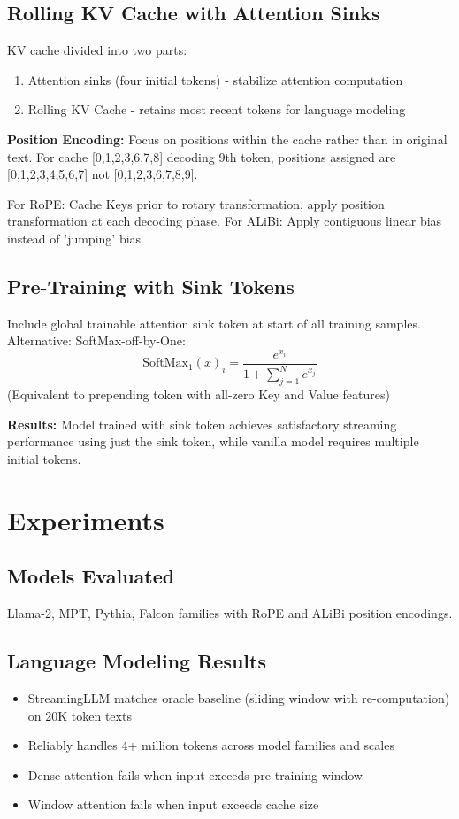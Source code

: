 \subsection{Rolling KV Cache with Attention Sinks}
KV cache divided into two parts:
\begin{enumerate}
\item Attention sinks (four initial tokens) - stabilize attention computation
\item Rolling KV Cache - retains most recent tokens for language modeling
\end{enumerate}

\textbf{Position Encoding:} Focus on positions within the cache rather than in original text. For cache [0,1,2,3,6,7,8] decoding 9th token, positions assigned are [0,1,2,3,4,5,6,7] not [0,1,2,3,6,7,8,9].

For RoPE: Cache Keys prior to rotary transformation, apply position transformation at each decoding phase.
For ALiBi: Apply contiguous linear bias instead of 'jumping' bias.

\subsection{Pre-Training with Sink Tokens}
Include global trainable attention sink token at start of all training samples. Alternative: SoftMax-off-by-One:
\begin{equation}
\text{SoftMax}_1(x)_i = \frac{e^{x_i}}{1 + \sum_{j=1}^N e^{x_j}}
\end{equation}
(Equivalent to prepending token with all-zero Key and Value features)

\textbf{Results:} Model trained with sink token achieves satisfactory streaming performance using just the sink token, while vanilla model requires multiple initial tokens.

\section{Experiments}

\subsection{Models Evaluated}
Llama-2, MPT, Pythia, Falcon families with RoPE and ALiBi position encodings.

\subsection{Language Modeling Results}
\begin{itemize}
\item StreamingLLM matches oracle baseline (sliding window with re-computation) on 20K token texts
\item Reliably handles 4+ million tokens across model families and scales
\item Dense attention fails when input exceeds pre-training window
\item Window attention fails when input exceeds cache size
\end{itemize}

